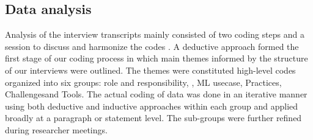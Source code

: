 \subsection{Data analysis}
Analysis of the interview transcripts mainly consisted of two coding steps and a session to discuss and harmonize the codes \cite{Runeson2008}. A deductive approach formed the first stage of our coding process in which main themes informed by the structure of our interviews were outlined. %
The themes were constituted high-level codes organized into six groups: role and responsibility, \DIFdelbegin {}\DIFdelend \DIFaddbegin {}\DIFaddend , ML usecase, Practices, Challenges\DIFaddbegin \DIFadd{, }\DIFaddend and Tools. The actual coding of data was done in an iterative manner using both deductive and inductive \cite{Runeson2008} approaches within each group and applied broadly at a paragraph or statement level. The sub-groups were further refined during researcher meetings.
 \DIFaddbegin 

 \DIFaddend